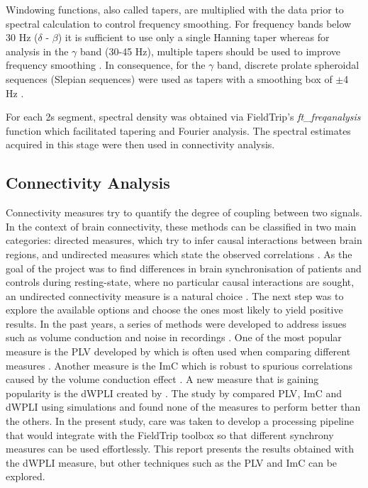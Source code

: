 			Windowing functions, also called tapers, are multiplied with the data prior to spectral calculation to control frequency smoothing. For frequency bands below 30 Hz (\(\delta\) - \(\beta\)) it is sufficient to use only a single Hanning taper whereas for analysis in the \(\gamma\) band (30-45 Hz), multiple tapers should be used to improve frequency smoothing \autocite{Mitra1999,Percival1993}. In consequence, for the \(\gamma\) band, discrete prolate spheroidal sequences (Slepian sequences) were used as tapers with a smoothing box of \(\pm\)4 Hz \autocite{Slepian1978,Hoogenboom2006}. 

			For each 2s segment, spectral density was obtained via FieldTrip's \textit{ft_freqanalysis} function which facilitated tapering and Fourier analysis. The spectral estimates acquired in this stage were then used in connectivity analysis.

		\subsection{Connectivity Analysis}
		Connectivity measures try to quantify the degree of coupling between two signals. In the context of brain connectivity, these methods can be classified in two main categories: directed measures, which try to infer causal interactions between brain regions, and undirected measures which state the observed correlations \autocite{Friston1994}. As the goal of the project was to find differences in brain synchronisation of patients and controls during resting-state, where no particular causal interactions are sought, an undirected connectivity measure is a natural choice \autocite{Fallani2014}. The next step was to explore the available options and choose the ones most likely to yield positive results. In the past years, a series of methods were developed to address issues such as volume conduction and noise in recordings \autocite{Vindiola2014}. One of the most popular measure is the \ac{PLV} developed by \textcite{Lachaux1999} which is often used when comparing different measures \autocite{Aydore2013}. Another measure is the \ac{ImC} which is robust to spurious correlations caused by the volume conduction effect \autocite{Nolte2004}. A new measure that is gaining popularity is the \ac{dWPLI} created by \textcite{Vinck2011}. The study by \textcite{Vindiola2014} compared \ac{PLV}, \ac{ImC} and \ac{dWPLI} using simulations and found none of the measures to perform better than the others. In the present study, care was taken to develop a processing pipeline that would integrate with the FieldTrip toolbox so that different synchrony measures can be used effortlessly. This report presents the results obtained with the \ac{dWPLI} measure, but other techniques such as the \ac{PLV} and \ac{ImC} can be explored. 
